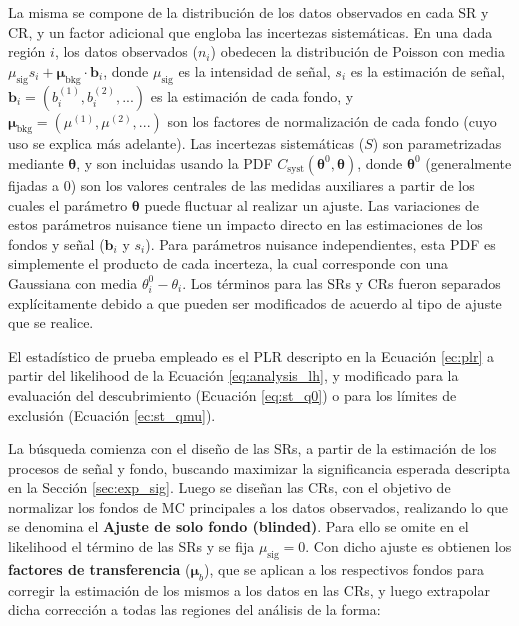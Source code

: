 La misma se compone de la distribución de los datos observados en cada SR y CR, y un factor adicional que engloba las incertezas sistemáticas. En una dada región $i$, los datos observados ($n_i$) obedecen la distribución de Poisson con media $\mu_\text{sig} s_i + \bm{\mu}_{\text{bkg}} \cdot \textbf{b}_i$, donde $\mu_\text{sig}$ es la intensidad de señal, $s_i$ es la estimación de señal, $\textbf{b}_i = (b_i^{(1)}, b_i^{(2)}, ...)$ es la estimación de cada fondo, y $\bm{\mu}_{\text{bkg}} = (\mu^{(1)}, \mu^{(2)}, ...)$ son los factores de normalización de cada fondo (cuyo uso se explica más adelante). Las incertezas sistemáticas ($S$) son parametrizadas mediante $\bm{\theta}$, y son incluidas usando la PDF $C_\text{syst} (\bm{\theta}^0, \bm{\theta})$, donde $\bm{\theta}^0$ (generalmente fijadas a 0) son los valores centrales de las medidas auxiliares a partir de los cuales el parámetro $\bm{\theta}$ puede fluctuar al realizar un ajuste. Las variaciones de estos parámetros nuisance tiene un impacto directo en las estimaciones de los fondos y señal ($\textbf{b}_i$ y $s_i$). Para parámetros nuisance independientes, esta PDF es simplemente el producto de cada incerteza, la cual corresponde con una Gaussiana con media $\theta_i^0 - \theta_i$. Los términos para las SRs y CRs fueron separados explícitamente debido a que pueden ser modificados de acuerdo al tipo de ajuste que se realice. 

El estadístico de prueba empleado es el PLR descripto en la Ecuación \ref{ec:plr} a partir del likelihood de la Ecuación \ref{eq:analysis_lh}, y modificado para la evaluación del descubrimiento (Ecuación \ref{eq:st_q0}) o para los límites de exclusión (Ecuación \ref{ec:st_qmu}).

La búsqueda comienza con el diseño de las SRs, a partir de la estimación de los procesos de señal y fondo, buscando maximizar la significancia esperada descripta en la Sección \ref{sec:exp_sig}. Luego se diseñan las CRs, con el objetivo de normalizar los fondos de MC principales a los datos observados, realizando lo que se denomina el \textbf{Ajuste de solo fondo (blinded)}. Para ello se omite en el likelihood el término de las SRs y se fija $\mu_\text{sig}=0$. Con dicho ajuste es obtienen los \textbf{factores de transferencia} ($\bm{\mu}_b$), que se aplican a los respectivos fondos para corregir la estimación de los mismos a los datos en las CRs, y luego extrapolar dicha corrección a todas las regiones del análisis de la forma:



